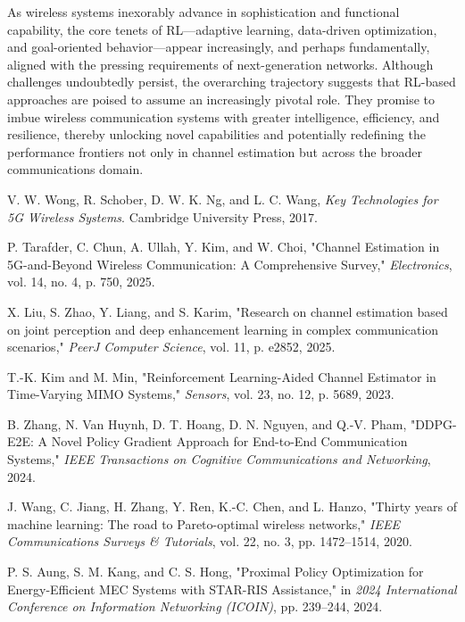 \documentclass[journal,twocolumn]{IEEEtran}
\begin{document}
As wireless systems inexorably advance in sophistication and functional capability, the core tenets of RL—adaptive learning, data-driven optimization, and goal-oriented behavior—appear increasingly, and perhaps fundamentally, aligned with the pressing requirements of next-generation networks. Although challenges undoubtedly persist, the overarching trajectory suggests that RL-based approaches are poised to assume an increasingly pivotal role. They promise to imbue wireless communication systems with greater intelligence, efficiency, and resilience, thereby unlocking novel capabilities and potentially redefining the performance frontiers not only in channel estimation but across the broader communications domain.

\begin{thebibliography}{20} %

V. W. Wong, R. Schober, D. W. K. Ng, and L. C. Wang, \emph{Key Technologies for 5G Wireless Systems}. Cambridge University Press, 2017.

P. Tarafder, C. Chun, A. Ullah, Y. Kim, and W. Choi, "Channel Estimation in 5G-and-Beyond Wireless Communication: A Comprehensive Survey," \emph{Electronics}, vol. 14, no. 4, p. 750, 2025.

X. Liu, S. Zhao, Y. Liang, and S. Karim, "Research on channel estimation based on joint perception and deep enhancement learning in complex communication scenarios," \emph{PeerJ Computer Science}, vol. 11, p. e2852, 2025.

T.-K. Kim and M. Min, "Reinforcement Learning-Aided Channel Estimator in Time-Varying MIMO Systems," \emph{Sensors}, vol. 23, no. 12, p. 5689, 2023.

B. Zhang, N. Van Huynh, D. T. Hoang, D. N. Nguyen, and Q.-V. Pham, "DDPG-E2E: A Novel Policy Gradient Approach for End-to-End Communication Systems," \emph{IEEE Transactions on Cognitive Communications and Networking}, 2024.

J. Wang, C. Jiang, H. Zhang, Y. Ren, K.-C. Chen, and L. Hanzo, "Thirty years of machine learning: The road to Pareto-optimal wireless networks," \emph{IEEE Communications Surveys \& Tutorials}, vol. 22, no. 3, pp. 1472--1514, 2020.

P. S. Aung, S. M. Kang, and C. S. Hong, "Proximal Policy Optimization for Energy-Efficient MEC Systems with STAR-RIS Assistance," in \emph{2024 International Conference on Information Networking (ICOIN)}, pp. 239--244, 2024.


\end{thebibliography}
\end{document}
